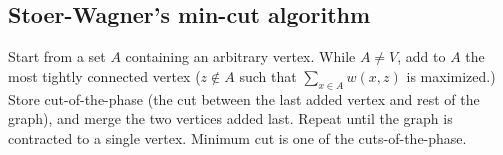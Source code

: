 \documentclass[12pt]{extarticle}
\begin{document}
\begin{multicols*}{2}





\subsection{Stoer-Wagner's min-cut algorithm}
Start from a set $A$ containing an arbitrary vertex.
While $A \ne V$, add to $A$ the most tightly connected vertex
($z \notin A$ such that $\sum_{x \in A} w(x, z)$ is maximized.)
Store cut-of-the-phase (the cut between the last added vertex and rest of
the graph), and merge the two vertices added last.  Repeat until the graph
is contracted to a single vertex.  Minimum cut is one of the cuts-of-the-phase.





\end{multicols*}
\end{document}
